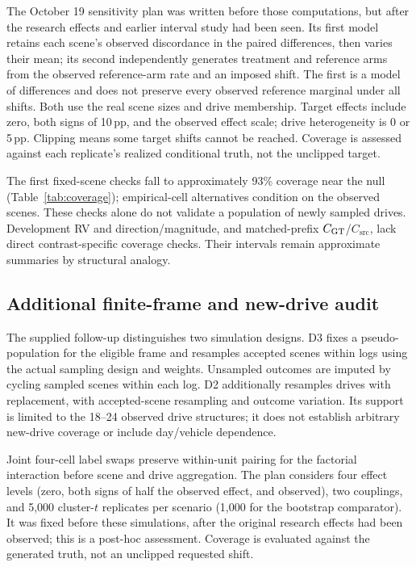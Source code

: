 The October 19 sensitivity plan was written before those computations, but after the research effects and earlier interval study had been seen. Its first model retains each scene's observed discordance in the paired differences, then varies their mean; its second independently generates treatment and reference arms from the observed reference-arm rate and an imposed shift. The first is a model of differences and does not preserve every observed reference marginal under all shifts. Both use the real scene sizes and drive membership. Target effects include zero, both signs of 10\,pp, and the observed effect scale; drive heterogeneity is 0 or 5\,pp. Clipping means some target shifts cannot be reached. Coverage is assessed against each replicate's realized conditional truth, not the unclipped target.

The first fixed-scene checks fall to approximately 93\% coverage near the null (Table~\ref{tab:coverage}); empirical-cell alternatives condition on the observed scenes. These checks alone do not validate a population of newly sampled drives. Development RV and direction/magnitude, and matched-prefix $C_{\mathrm{GT}}$/$C_{\mathrm{src}}$, lack direct contrast-specific coverage checks. Their intervals remain approximate summaries by structural analogy.

\subsection{Additional finite-frame and new-drive audit}
The supplied follow-up distinguishes two simulation designs. D3 fixes a pseudo-population for the eligible frame and resamples accepted scenes within logs using the actual sampling design and weights. Unsampled outcomes are imputed by cycling sampled scenes within each log. D2 additionally resamples drives with replacement, with accepted-scene resampling and outcome variation. Its support is limited to the 18--24 observed drive structures; it does not establish arbitrary new-drive coverage or include day/vehicle dependence.

Joint four-cell label swaps preserve within-unit pairing for the factorial interaction before scene and drive aggregation. The plan considers four effect levels (zero, both signs of half the observed effect, and observed), two couplings, and 5,000 cluster-$t$ replicates per scenario (1,000 for the bootstrap comparator). It was fixed before these simulations, after the original research effects had been observed; this is a post-hoc assessment. Coverage is evaluated against the generated truth, not an unclipped requested shift.


